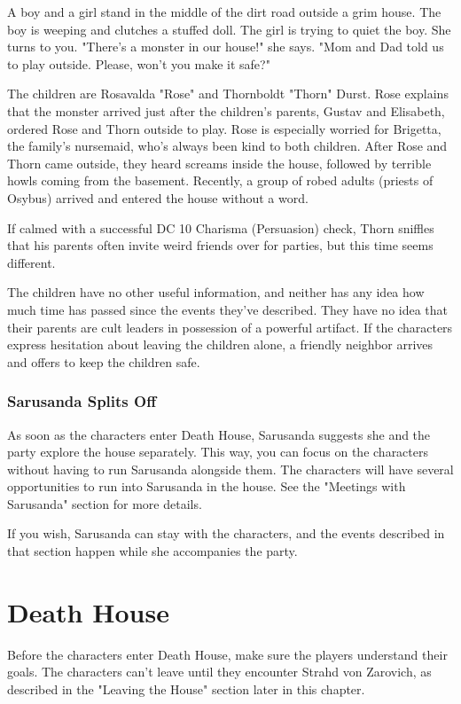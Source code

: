 \documentclass[10pt,a4paper,twoside,bg=print,twocolumn,openany,nodeprecatedcode]{dndbook}
\begin{document}
\begin{DndReadAloud}{}
A boy and a girl stand in the middle of the dirt road outside a grim house. The boy is weeping and clutches a stuffed doll. The girl is trying to quiet the boy. She turns to you. "There's a monster in our house!" she says. "Mom and Dad told us to play outside. Please, won't you make it safe?"

\end{DndReadAloud}

The children are Rosavalda "Rose" and Thornboldt "Thorn" Durst. Rose explains that the monster arrived just after the children's parents, Gustav and Elisabeth, ordered Rose and Thorn outside to play. Rose is especially worried for Brigetta, the family's nursemaid, who's always been kind to both children. After Rose and Thorn came outside, they heard screams inside the house, followed by terrible howls coming from the basement. Recently, a group of robed adults (priests of Osybus) arrived and entered the house without a word.

If calmed with a successful DC 10 Charisma (Persuasion) check, Thorn sniffles that his parents often invite weird friends over for parties, but this time seems different.

The children have no other useful information, and neither has any idea how much time has passed since the events they've described. They have no idea that their parents are cult leaders in possession of a powerful artifact. If the characters express hesitation about leaving the children alone, a friendly neighbor arrives and offers to keep the children safe.

\subsubsection{Sarusanda Splits Off}
As soon as the characters enter Death House, Sarusanda suggests she and the party explore the house separately. This way, you can focus on the characters without having to run Sarusanda alongside them. The characters will have several opportunities to run into Sarusanda in the house. See the "Meetings with Sarusanda" section for more details.

If you wish, Sarusanda can stay with the characters, and the events described in that section happen while she accompanies the party.

\section{Death House}
Before the characters enter Death House, make sure the players understand their goals. The characters can't leave until they encounter Strahd von Zarovich, as described in the "Leaving the House" section later in this chapter.
\end{document}
